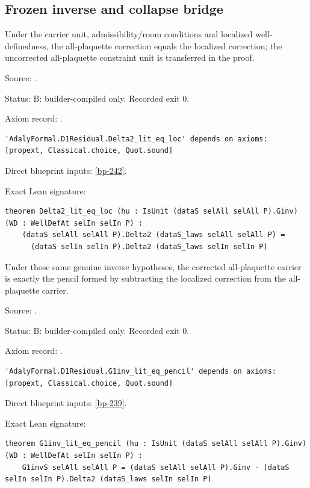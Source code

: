 \subsection{Frozen inverse and collapse bridge}

\begin{theorem}[bp-239]
\label{bp-239}
\leanok
Under the carrier unit, admissibility/room conditions and localized well-definedness, the all-plaquette correction equals the localized correction; the uncorrected all-plaquette constraint unit is transferred in the proof.

\par Source: \texttt{}.
\par Status: B: builder-compiled only. Recorded exit 0.
\par Axiom record: \texttt{}.
\begin{verbatim}
'AdalyFormal.D1Residual.Delta2_lit_eq_loc' depends on axioms: [propext, Classical.choice, Quot.sound]
\end{verbatim}
\par Direct blueprint inputs: \ref{bp-242}.
\par Exact Lean signature:
\begin{verbatim}
theorem Delta2_lit_eq_loc (hu : IsUnit (dataS selAll selAll P).Ginv) (WD : WellDefAt selIn selIn P) :
    (dataS selAll selAll P).Delta2 (dataS_laws selAll selAll P) =
      (dataS selIn selIn P).Delta2 (dataS_laws selIn selIn P)
\end{verbatim}
\end{theorem}

\begin{theorem}[bp-240]
\label{bp-240}
\leanok
Under those same genuine inverse hypotheses, the corrected all-plaquette carrier is exactly the pencil formed by subtracting the localized correction from the all-plaquette carrier.

\par Source: \texttt{}.
\par Status: B: builder-compiled only. Recorded exit 0.
\par Axiom record: \texttt{}.
\begin{verbatim}
'AdalyFormal.D1Residual.G1inv_lit_eq_pencil' depends on axioms: [propext, Classical.choice, Quot.sound]
\end{verbatim}
\par Direct blueprint inputs: \ref{bp-239}.
\par Exact Lean signature:
\begin{verbatim}
theorem G1inv_lit_eq_pencil (hu : IsUnit (dataS selAll selAll P).Ginv) (WD : WellDefAt selIn selIn P) :
    G1invS selAll selAll P = (dataS selAll selAll P).Ginv - (dataS selIn selIn P).Delta2 (dataS_laws selIn selIn P)
\end{verbatim}
\end{theorem}

